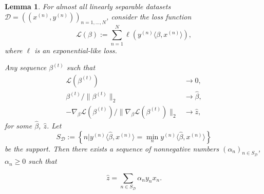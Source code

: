 \documentclass{article}
\theoremstyle{plain}
\newtheorem{lemma}[theorem]{Lemma}
\theoremstyle{definition}
\theoremstyle{remark}
\begin{document}
\begin{lemma}
\label{lem:gunasekar}
For almost all linearly separable datasets $\mathcal{D}=\left((x^{(n)},y^{(n)})\right)_{n=1,\dotsc,N}$, consider the loss function
\begin{equation}
    \mathcal{L}(\beta):=\sum_{n=1}^N\ell(y^{(n)}\langle\beta,x^{(n)}\rangle),
\end{equation}
where $\ell$ is an exponential-like loss.

Any sequence $\beta^{(t)}$ such that
\begin{align}
    \mathcal{L}(\beta^{(t)})&\to 0,
    \label{eq:gun-conda-1}\\
    \beta^{(t)}/\|\beta^{(t)}\|_2&\to\hat{\beta},
    \label{eq:gun-conda-2}\\
    -\nabla_{\beta}\mathcal{L}(\beta^{(t)})/\|\nabla_{\beta}\mathcal{L}(\beta^{(t)})\|_2&\to \hat{z},
    \label{eq:gun-conda-3}
\end{align}
for some $\hat{\beta}$, $\hat{z}$. Let
\begin{equation}
    S_{\mathcal{D}}:=\left\{n|y^{(n)}\langle\hat{\beta},x^{(n)}\rangle=\min_ny^{(n)}\langle\hat{\beta},x^{(n)}\rangle\right\}
\end{equation}
be the \emph{support}. Then there exists a sequence of nonnegative numbers $(\alpha_n)_{n\in S_{\mathcal{D}}}$, $\alpha_n\geq 0$ such that

\begin{equation}
    \hat{z}=\sum_{n\in S_{\mathcal{D}}}\alpha_ny_nx_n.
\end{equation}
\end{lemma}
\end{document}
